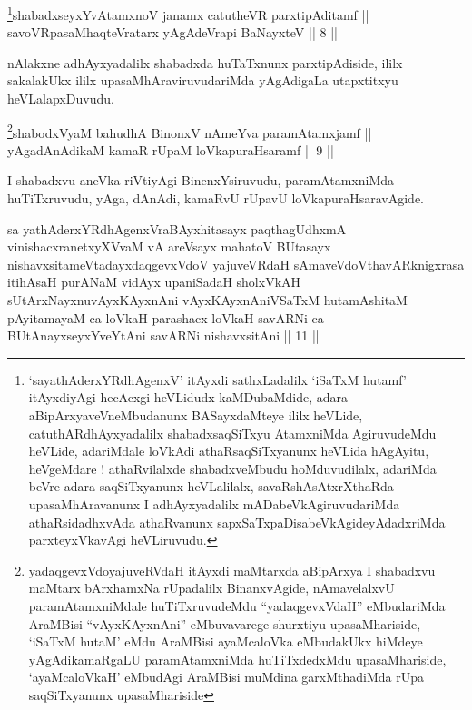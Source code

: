 \begin{shl}
\footnote{`sayathA\s \s derxYRdhAgenxV' itAyxdi sathxLadalilx `iSaTxM hutamf' itAyxdiyAgi hecAcxgi heVLidudx kaMDubaMdide, adara aBipArxyaveVneMbudanunx BASayxdaMteye ililx heVLide, catuthARdhAyxyadalilx shabadxsaqSiTxyu AtamxniMda AgiruvudeMdu heVLide, adariMdale loVkAdi athaRsaqSiTxyanunx heVLida hAgAyitu, heVgeMdare ! athaRvilalxde shabadxveMbudu hoMduvudilalx, adariMda beVre adara saqSiTxyanunx heVLalilalx, savaRshAsAtxrXthaRda upasaMhAravanunx I adhAyxyadalilx mADabeVkAgiruvudariMda athaRsidadhxvAda athaRvanunx sapxSaTxpaDisabeVkAgideyAdadxriMda parxteyxVkavAgi heVLiruvudu.}shabadxseyxYvA\s \s tamxnoV janamx catutheVR parxtipAditamf || \\
savoVRpasaMhaqteVratarx yAgAdeVrapi BaNayxteV \hfill || 8 ||
\end{shl}
				
\begin{artha}
nAlakxne adhAyxyadalilx shabadxda huTaTxnunx parxtipAdiside, ililx sakalakUkx ililx upasaMhAraviruvudariMda yAgAdigaLa utapxtitxyu heVLalapxDuvudu.
\end{artha}

\begin{shl}
\footnote{yadaqgevxVdoyajuveRVdaH itAyxdi maMtarxda aBipArxya \mdash   I shabadxvu maMtarx bArxhamxNa rUpadalilx BinanxvAgide, nAmavelalxvU paramAtamxniMdale huTiTxruvudeMdu ``yadaqgevxVdaH'' eMbudariMda AraMBisi ``vAyxKAyxnAni'' eMbuvavarege shurxtiyu upasaMhariside, `iSaTxM hutaM' eMdu AraMBisi ayaMcaloVka eMbudakUkx hiMdeye yAgAdikamaRgaLU paramAtamxniMda huTiTxdedxMdu upasaMhariside, `ayaMcaloVkaH' eMbudAgi AraMBisi muMdina garxMthadiMda rUpa saqSiTxyanunx upasaMhariside}shabodxV\s yaM bahudhA BinonxV nAmeYva paramAtamxjamf || \\
yAgadAnAdikaM kamaR rUpaM loVkapuraHsaramf \hfill || 9 ||  
\end{shl}

\begin{artha}
I shabadxvu aneVka riVtiyAgi BinenxYsiruvudu, paramAtamxniMda huTiTxruvudu, yAga, dAnAdi, kamaRvU rUpavU loVkapuraHsaravAgide.
\end{artha}


\begin{kandikeshl}
sa yathAderxYRdhAgenxVraBAyxhitasayx paqthagUdhxmA vinishacxranetxyXVvaM vA areV\s sayx mahatoV BUtasayx nishavxsitameVtadayxdaqgevxVdoV yajuveVRdaH sAmaveVdoV\s thavARknigxrasa itihAsaH purANaM vidAyx upaniSadaH sholxVkAH sUtArxNayxnuvAyxKAyxnAni vAyxKAyxnAniVSaTxM hutamAshitaM pAyitamayaM ca loVkaH parashacx loVkaH savARNi ca BUtAnayxseyxYveYtAni savARNi nishavxsitAni || 11 ||
\end{kandikeshl}

